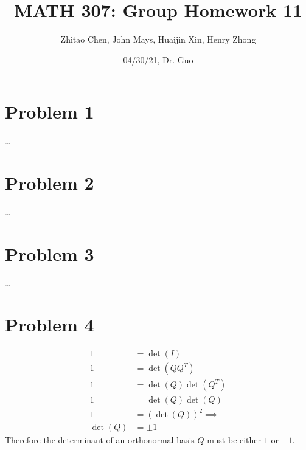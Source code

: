 \documentclass[fleqn]{article}
\title{\textbf{MATH 307: Group Homework 11}}
\author{Zhitao Chen, John Mays, Huaijin Xin, Henry Zhong}
\date{04/30/21, Dr. Guo}
\begin{document}
\maketitle

\section*{Problem 1}
\dots
\section*{Problem 2}
\dots
\section*{Problem 3}
\dots
\section*{Problem 4}
\begin{equation*}
\begin{split}
    1 &= \det(I)\\
    1 &= \det(QQ^T)\\
    1 &= \det(Q)\det(Q^T)\\
    1 &= \det(Q)\det(Q)\\
    1 &= (\det(Q))^2 \implies \\
    \det(Q) &= \pm 1
\end{split}
\end{equation*}
Therefore the determinant of an orthonormal basis $Q$ must be either $1$ or $-1$.
\end{document}
